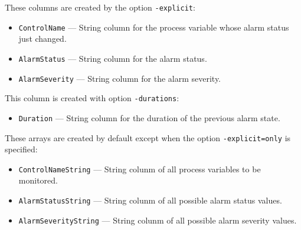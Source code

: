 \begin{itemize}
\begin{itemize}
These columns are created by the option {\tt -explicit}:
\begin{itemize}
        \item {\tt ControlName} --- String column for the process variable whose alarm
        status just changed.
        \item {\tt AlarmStatus} --- String column for the alarm status. 
        \item {\tt AlarmSeverity} --- String column for the alarm severity. 
\end{itemize}

This column is created with option {\tt -durations}:
\begin{itemize}
        \item {\tt Duration} --- String column for the duration of the previous alarm state.
\end{itemize}

These arrays are created by default except when the option {\tt -explicit=only} is specified:
\begin{itemize}
        \item {\tt ControlNameString} --- String colunm of all process variables to be monitored.
        \item {\tt AlarmStatusString} --- String colunm of all possible alarm status values.
        \item {\tt AlarmSeverityString} --- String colunm of all possible alarm severity values.
\end{itemize}


\end{itemize}
\end{itemize}

